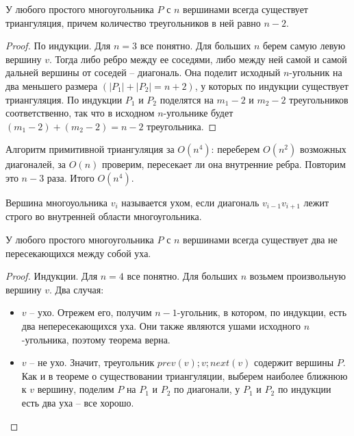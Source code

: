 \documentclass[11pt]{article}
\begin{document}
\begin{thm}
У любого простого многоугольника $P$ с $n$ вершинами всегда
существует триангуляция, причем количество треугольников в ней
равно $n-2$.
\end{thm}

\begin{proof}
По индукции. Для $n=3$ все понятно. Для больших $n$ берем самую
левую вершину $v$. Тогда либо ребро между ее соседями, либо между
ней самой и самой дальней вершины от соседей \--- диагональ. Она
поделит исходный $n$-угольник на два меньшего размера
$(|P_1| + |P_2| = n + 2)$, у которых по индукции существует
триангуляция. По индукции $P_1$ и $P_2$ поделятся на $m_1 - 2$ и
$m_2 - 2$ треугольников соответственно, так что в исходном
$n$-угольнике будет $(m_1 - 2) + (m_2 - 2) = n - 2$ треугольника.
\end{proof}

Алгоритм примитивной триангуляция за $O(n^4)$: переберем $O(n^2)$
возможных диагоналей, за $O(n)$ проверим, пересекает ли она
внутренние ребра. Повторим это $n-3$ раза. Итого $O(n^4)$.

\begin{defn}[ухо]
Вершина многоуольника $v_i$ называется ухом, если диагональ
$v_{i-1}v_{i+1}$ лежит строго во внутренней области многоугольника.
\end{defn}

\begin{thm}
У любого простого многоугольника $P$ с $n$ вершинами всегда
существует два не пересекающихся между собой уха.
\end{thm}

\begin{proof}
Индукции. Для $n=4$ все понятно. Для больших $n$
возьмем произвольную вершину $v$. Два случая:
\begin{itemize}
\item $v$ \--- ухо. Отрежем его, получим $n-1$-угольник, в котором, по
индукции, есть два непересекающихся уха. Они также являются ушами
исходного $n$-угольника, поэтому теорема верна.
\item $v$ \--- не ухо. Значит, треугольник $prev(v); v; next(v)$ содержит
вершины $P$. Как и в теореме о существовании триангуляции,
выберем наиболее ближнюю к $v$ вершину, поделим $P$ на $P_1$ и
$P_2$ по диагонали, у $P_1$ и $P_2$ по индукции есть два уха \--- все
хорошо.
\end{itemize}
\end{proof}
\end{document}
